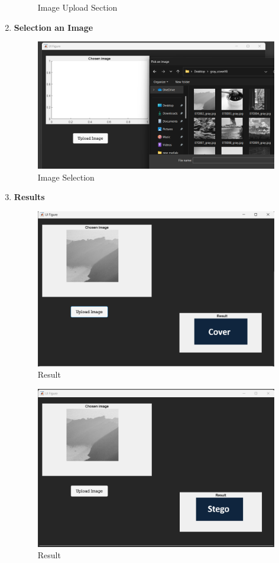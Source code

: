 \begin{enumerate}
\begin{figure}[H]
    \caption{Image Upload Section}
\end{figure}
\item \Large \textbf{Selection an Image}
\begin{figure}[H]
    \centering
    \includegraphics[width=140mm]{./img/selectsample.png}
    \caption{Image Selection}
\end{figure}
\clearpage 
\item \Large \textbf{Results}
\begin{figure}[H]
    \centering
    \includegraphics[width=140mm]{./img/resultGrayCover.png}
    \caption{Result}
\end{figure}
\begin{figure}[H]
    \centering
    \includegraphics[width=140mm]{./img/resultGrayStego.png}
    \caption{Result}
\end{figure}
\end{enumerate}